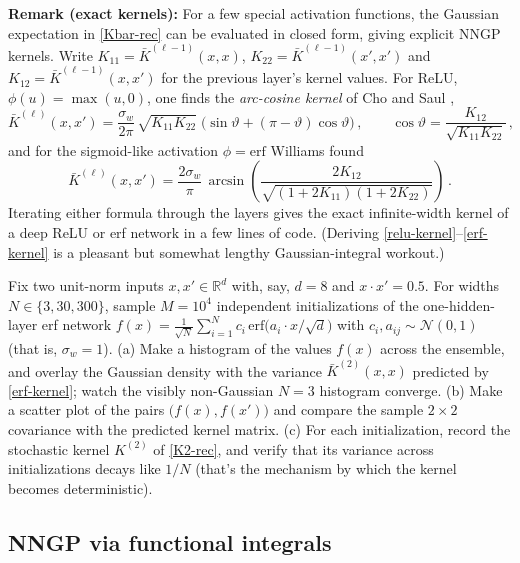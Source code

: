 \documentclass[11pt]{article}
\newcommand{\R}{\mathbb{R}}
\newcommand{\CN}{{\mathcal N}}
\begin{document}
\smallskip
\noindent\textbf{Remark (exact kernels):} For a few special activation functions, the Gaussian expectation in \eqref{Kbar-rec} can be evaluated in closed form, giving explicit NNGP kernels. Write $K_{11}=\bar K^{(\ell-1)}(x,x)$, $K_{22}=\bar K^{(\ell-1)}(x',x')$ and $K_{12}=\bar K^{(\ell-1)}(x,x')$ for the previous layer's kernel values. For ReLU, $\phi(u)=\max(u,0)$, one finds the \emph{arc-cosine kernel} of Cho and Saul \cite{cho2009kernel},
%
\begin{equation} \label{relu-kernel}
    \bar K^{(\ell)}(x,x') = \frac{\sigma_w}{2\pi}\,\sqrt{K_{11}K_{22}}\;\Big(\sin\vartheta + (\pi - \vartheta)\cos\vartheta\Big)\,,
    \qquad
    \cos\vartheta = \frac{K_{12}}{\sqrt{K_{11}K_{22}}}\,,
\end{equation}
%
and for the sigmoid-like activation $\phi = \mathrm{erf}$ Williams \cite{williams1997computing} found
%
\begin{equation} \label{erf-kernel}
    \bar K^{(\ell)}(x,x') = \frac{2\sigma_w}{\pi}\, \arcsin\!\left(\frac{2K_{12}}{\sqrt{(1+2K_{11})(1+2K_{22})}}\right)\,.
\end{equation}
%
Iterating either formula through the layers gives the exact infinite-width kernel of a deep ReLU or erf network in a few lines of code. (Deriving \eqref{relu-kernel}--\eqref{erf-kernel} is a pleasant but somewhat lengthy Gaussian-integral workout.)

\begin{exercise}
\label{ex:nngp-lab}
Fix two unit-norm inputs $x, x'\in\R^d$ with, say, $d=8$ and $x\cdot x' = 0.5$. For widths $N \in \{3, 30, 300\}$, sample $M = 10^4$ independent initializations of the one-hidden-layer erf network $f(x) = \frac{1}{\sqrt N}\sum_{i=1}^N c_i\, \mathrm{erf}\big(a_i\cdot x/\sqrt d\big)$ with $c_i, a_{ij}\sim\CN(0,1)$ (that is, $\sigma_w = 1$).
(a) Make a histogram of the values $f(x)$ across the ensemble, and overlay the Gaussian density with the variance $\bar K^{(2)}(x,x)$ predicted by \eqref{erf-kernel}; watch the visibly non-Gaussian $N=3$ histogram converge.
(b) Make a scatter plot of the pairs $\big(f(x), f(x')\big)$ and compare the sample $2\times2$ covariance with the predicted kernel matrix.
(c) For each initialization, record the stochastic kernel $K^{(2)}$ of \eqref{K2-rec}, and verify that its variance across initializations decays like $1/N$ (that's the mechanism by which the kernel becomes deterministic).
\end{exercise}


\subsection{NNGP via functional integrals}
\label{sec:NNGP-int}
\end{document}
